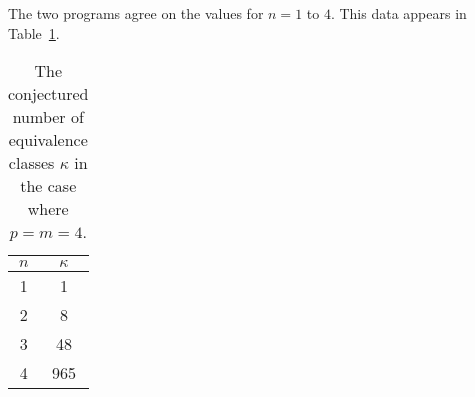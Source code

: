 \documentclass[12pt,table]{article}
\theoremstyle{definition}
\theoremstyle{remark}
\numberwithin{equation}{section}
\begin{document}
The two programs agree on the values for 
$n = 1$ to $4$. This data appears in 
Table~\ref{table:4D}.


\begin{table}[h]




\begin{center}


\begin{tabular}{ c | c }
 $ n $ & $ \kappa $ \\
\hline\hline
 1 & 1 \\
\hline
 2 & 8 \\
\hline
 3 & 48 \\
\hline
 4 & 965 
\end{tabular}





\end{center}
\caption{
The conjectured number of equivalence
classes $ \kappa $  
in the case where $p = m = 4$.
 }

\label{table:4D}

\end{table}

\newpage
\end{document}
